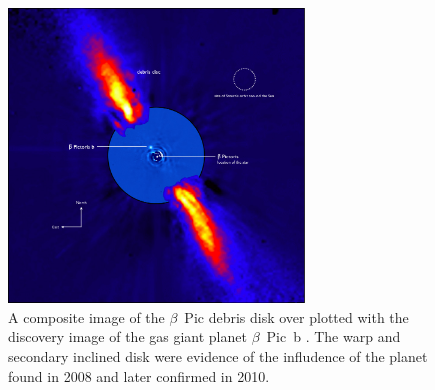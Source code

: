     \begin{figure}
    \centering
    \includegraphics[width=0.7\textwidth]{Ch1/Beta_Pictoris_planetdisk}
    \caption[$\beta$~Pictoris Disk and Planet]{A composite image of the $\beta$~Pic debris disk over plotted with the discovery image of the gas giant planet $\beta$~Pic~b \citep{Lagrange2010}. The warp and secondary inclined disk were evidence of the infludence of the planet found in 2008 and later confirmed in 2010.}
    \label{fig:betapic_diskplanet}
    \end{figure}
    
    
    
